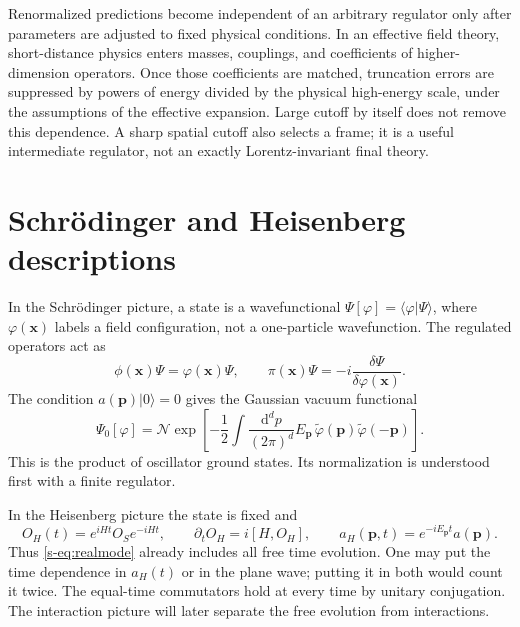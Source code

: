 \documentclass[11pt]{article}
\newcommand{\dd}{\mathrm{d}}
\newcommand{\vac}{\lvert0\rangle}
\begin{document}
\begin{warningbox}
Renormalized predictions become independent of an arbitrary regulator
only after parameters are adjusted to fixed physical conditions.
In an effective field theory, short-distance physics enters masses,
couplings, and coefficients of higher-dimension operators. Once those
coefficients are matched, truncation errors are suppressed by powers of
energy divided by the physical high-energy scale, under the assumptions
of the effective expansion. Large cutoff by itself does not remove this
dependence. A sharp spatial cutoff also selects a frame; it is a useful
intermediate regulator, not an exactly Lorentz-invariant final theory.
\end{warningbox}

\section{Schr\"odinger and Heisenberg descriptions}
In the Schr\"odinger picture, a state is a wavefunctional
\(\Psi[\varphi]=\langle\varphi|\Psi\rangle\), where \(\varphi(\bm x)\) labels a
field configuration, not a one-particle wavefunction. The regulated
operators act as
\[
 \phi(\bm x)\Psi=\varphi(\bm x)\Psi,\qquad
 \pi(\bm x)\Psi=-i\frac{\delta\Psi}{\delta\varphi(\bm x)}.
\]
The condition \(a(\bm p)\vac=0\) gives the Gaussian vacuum functional
\begin{equation}
 \Psi_0[\varphi]=\mathcal N\exp\left[-\frac12\int
 \frac{\dd^dp}{(2\pi)^d}E_{\bm p}\,
 \widetilde\varphi(\bm p)\widetilde\varphi(-\bm p)\right].
 \label{s-eq:gaussian}
\end{equation}
This is the product of oscillator ground states. Its normalization is
understood first with a finite regulator.

In the Heisenberg picture the state is fixed and
\begin{equation}
 O_H(t)=e^{iHt}O_S e^{-iHt},\qquad
 \partial_tO_H=i[H,O_H],\qquad
 a_H(\bm p,t)=e^{-iE_{\bm p}t}a(\bm p).
 \label{s-eq:Heisenberg}
\end{equation}
Thus \eqref{s-eq:realmode} already includes all free time evolution.
One may put the time dependence in \(a_H(t)\) or in the plane wave;
putting it in both would count it twice. The equal-time commutators hold
at every time by unitary conjugation. The interaction picture will later
separate the free evolution from interactions.

\end{document}
